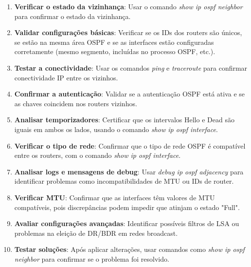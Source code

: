 \documentclass[11pt,english, openright, oneside]{book}
\begin{document}
\begin{enumerate}
    \begin{enumerate}
    
        \item \textbf{Verificar o estado da vizinhança}: Usar o comando \textit{show ip ospf neighbor} para confirmar o estado da vizinhança.
        
        \item \textbf{Validar configurações básicas}: Verificar se os IDs dos routers são únicos, se estão na mesma área OSPF e se as interfaces estão configuradas corretamente (mesmo segmento, incluídas no processo OSPF, etc.).
        
        \item \textbf{Testar a conectividade}: Usar os comandos \textit{ping} e \textit{traceroute} para confirmar conectividade IP entre os vizinhos.
        
        \item \textbf{Confirmar a autenticação}: Validar se a autenticação OSPF está ativa e se as chaves coincidem nos routers vizinhos.
        
        \item \textbf{Analisar temporizadores}: Certificar que os intervalos Hello e Dead são iguais em ambos os lados, usando o comando \textit{show ip ospf interface}.
        
        \item \textbf{Verificar o tipo de rede}: Confirmar que o tipo de rede OSPF é compatível entre os routers, com o comando \textit{show ip ospf interface}.
        
        \item \textbf{Analisar logs e mensagens de debug}: Usar \textit{debug ip ospf adjacency} para identificar problemas como incompatibilidades de MTU ou IDs de router.
        
        \item \textbf{Verificar MTU}: Confirmar que as interfaces têm valores de MTU compatíveis, pois discrepâncias podem impedir que atinjam o estado "Full".
        
        \item \textbf{Avaliar configurações avançadas}: Identificar possíveis filtros de LSA ou problemas na eleição de DR/BDR em redes broadcast.
        
        \item \textbf{Testar soluções}: Após aplicar alterações, usar comandos como \textit{show ip ospf neighbor} para confirmar se o problema foi resolvido.
        

\end{enumerate}
\end{enumerate}
\end{document}
